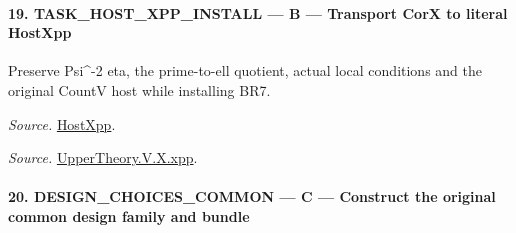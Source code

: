 \documentclass[11pt,a4paper]{article}
\numberwithin{equation}{section}
\theoremstyle{remark}\newtheorem{remark}[theorem]{Remark}
\begin{document}
\paragraph{19. TASK\_\allowbreak HOST\_\allowbreak XPP\_\allowbreak INSTALL — B — Transport CorX to literal HostXpp}

Preserve Psi\textasciicircum{}-2 eta, the prime-to-ell quotient, actual local conditions and the original CountV host while installing BR7.

\emph{Source.} \href{https://github.com/CocoSgt/riemann-hypothesis-lean/blob/7cbf7a0c32fca1badf05931879a37c3f8a2b03b4/src/Development/AutomorphicArithmetic/AutomorphicVarieties/UnitaryThreeDeformations/HostNumber.lean#L14-L17}{HostXpp}.

\emph{Source.} \href{https://github.com/CocoSgt/riemann-hypothesis-lean/blob/7cbf7a0c32fca1badf05931879a37c3f8a2b03b4/src/Development/AutomorphicArithmetic/AutomorphicVarieties/LevelCohomology/Xpp.lean#L11-L84}{UpperTheory.V.X.xpp}.



\paragraph{20. DESIGN\_\allowbreak CHOICES\_\allowbreak COMMON — C — Construct the original common design family and bundle}
\end{document}
